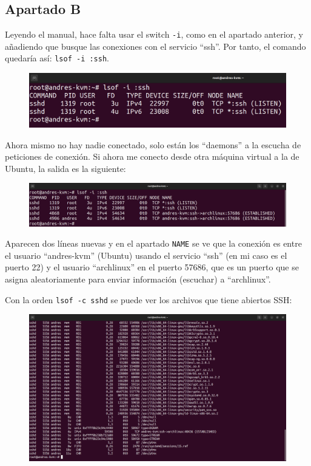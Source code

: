 \documentclass{article}
\begin{document}
\subsection*{Apartado B}
Leyendo el manual, hace falta usar el switch \verb|-i|, como en el apartado anterior, y añadiendo que busque las conexiones con el servicio ``ssh''. Por tanto, el comando quedaría así: \verb|lsof -i :ssh|.

\begin{figure}[H]
    \includegraphics[width=\textwidth]{imagenes/lsofisshlisten.png}
\end{figure}

Ahora mismo no hay nadie conectado, solo están los ``daemons'' a la escucha de peticiones de conexión. Si ahora me conecto desde otra máquina virtual a la de Ubuntu, la salida es la siguiente:

\begin{figure}[H]
    \includegraphics[width=\textwidth]{imagenes/lsofissharch.png}
\end{figure}


Aparecen dos líneas nuevas y en el apartado \verb|NAME| se ve que la conexión es entre el usuario ``andres-kvm'' (Ubuntu) usando el servicio ``ssh'' (en mi caso es el puerto 22)  y el usuario ``archlinux'' en el puerto 57686, que es un puerto que se asigna aleatoriamente para enviar información (escuchar) a ``archlinux''.

\newpage

Con la orden \verb|lsof -c sshd| se puede ver los archivos que tiene abiertos SSH:

\begin{figure}[H]
    \includegraphics[width=\textwidth]{imagenes/lsofcsshd.png}
\end{figure}
\end{document}
